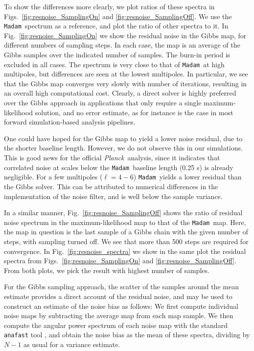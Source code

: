 \documentclass[twocolumn]{aa}
\newcommand{\Madam}{\texttt{Madam}}
\def\Planck{\textit{Planck}}
\begin{document}
To show the differences more clearly, we plot ratios of these spectra
in Figs.~\ref{fig:resnoise_SamplingOn} and
\ref{fig:resnoise_SamplingOff}.  We use the \Madam\ spectrum as a
reference, and plot the ratio of other spectra to it.  In
Fig.~\ref{fig:resnoise_SamplingOn} we show the residual noise in the
Gibbs map, for different numbers of sampling steps.  In each case, the
map is an average of the Gibbs samples over the indicated number of
samples.  The burn-in period is excluded in all cases.  The spectrum
is very close to that of \Madam\ at high multipoles, but differences
are seen at the lowest multipoles. In particular, we see that the
Gibbs map converges very slowly with number of iterations,
resulting in an overall high computational cost. Clearly, a direct solver
 is highly preferred over the Gibbs approach in
applications that only require a single maximum-likelihood solution,
and no error estimate, as for instance is the case in most forward
simulation-based analysis pipelines.

One could have hoped for the Gibbs map to yield a lower noise
residual, due to the shorter baseline length. However, we do not
observe this in our simulations.  This is good news for the official
\Planck\ analysis, since it indicates that correlated noise at scales
below the \Madam\ baseline length (0.25 s) is already negligible.  For
a few multipoles ($\ell=4-6$) \Madam\ yields a lower residual than the
Gibbs solver.  This can be attributed to numerical differences in the
implementation of the noise filter, and is well below the sample
variance.

In a similar manner, Fig.~\ref{fig:resnoise_SamplingOff} shows the
ratio of residual noise spectrum in the maximum-likelihood map to that of
the \Madam\ map.  Here, the map in question is the last sample of a Gibbs chain
with the given number of steps, with sampling turned off. We see that
more than 500 steps are required for convergence. In
Fig.~\ref{fig:resnoise_spectra} we show in the same plot the 
residual spectra from Figs.~\ref{fig:resnoise_SamplingOn} and
\ref{fig:resnoise_SamplingOff}.  From both plots, we pick the result
with highest number of samples.

For the Gibbs sampling approach, the scatter of the samples around the
mean estimate provides a direct account of the residual noise, and may
be used to construct an estimate of the noise bias as follows:
We first compute individual noise maps by subtracting the average map
from each map sample.  We then compute the angular power spectrum of
each noise map with the standard {\tt anafast} tool
\citep{gorski2005}, and obtain the noise bias as the mean of these
spectra, dividing by $N-1$ as usual for a variance estimate.
\end{document}
